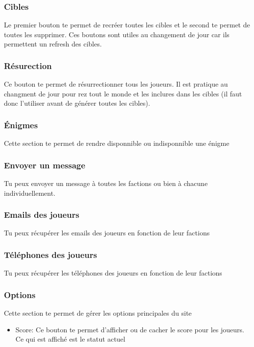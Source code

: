 \documentclass[12pt]{article}
\begin{document}
\subsubsection{Cibles}
Le premier bouton te permet de recréer toutes les cibles et le second te permet de toutes les supprimer. Ces boutons sont utiles au changement de jour car ils permettent un refresh des cibles.

\subsubsection{Résurection}
Ce bouton te permet de résurrectionner tous les joueurs. Il est pratique au changment de jour pour rez tout le monde et les inclures dans les cibles (il faut donc l'utiliser avant de générer toutes les cibles).

\subsubsection{Énigmes}
Cette section te permet de rendre disponnible ou indisponnible une énigme

\subsubsection{Envoyer un message}
Tu peux envoyer un message à toutes les factions ou bien à chacune individuellement.

\subsubsection{Emails des joueurs}
Tu peux récupérer les emails des joueurs en fonction de leur factions

\subsubsection{Téléphones des joueurs}
Tu peux récupérer les téléphones des joueurs en fonction de leur factions

\subsubsection{Options}
Cette section te permet de gérer les options principales du site
\begin{itemize}
  \item Score: Ce bouton te permet d'afficher ou de cacher le score pour les joueurs. Ce qui est affiché est le statut actuel
\end{itemize}
\end{document}
